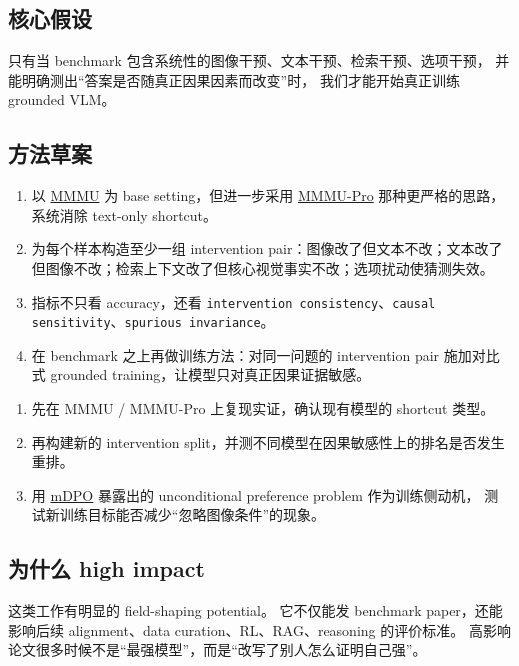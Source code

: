 \documentclass[12pt,a4paper]{article}
\begin{document}
\subsection{核心假设}

只有当 benchmark 包含系统性的图像干预、文本干预、检索干预、选项干预，
并能明确测出``答案是否随真正因果因素而改变''时，
我们才能开始真正训练 grounded VLM。

\subsection{方法草案}

\begin{enumerate}[leftmargin=2em]
  \item 以 \href{https://arxiv.org/abs/2311.16502}{MMMU} 为 base setting，但进一步采用 \href{https://arxiv.org/abs/2409.02813}{MMMU-Pro} 那种更严格的思路，系统消除 text-only shortcut。
  \item 为每个样本构造至少一组 intervention pair：图像改了但文本不改；文本改了但图像不改；检索上下文改了但核心视觉事实不改；选项扰动使猜测失效。
  \item 指标不只看 accuracy，还看 \texttt{intervention consistency}、\texttt{causal sensitivity}、\texttt{spurious invariance}。
  \item 在 benchmark 之上再做训练方法：对同一问题的 intervention pair 施加对比式 grounded training，让模型只对真正因果证据敏感。
\end{enumerate}

\begin{expbox}
\begin{enumerate}[leftmargin=2em]
  \item 先在 MMMU / MMMU-Pro 上复现实证，确认现有模型的 shortcut 类型。
  \item 再构建新的 intervention split，并测不同模型在因果敏感性上的排名是否发生重排。
  \item 用 \href{https://arxiv.org/abs/2406.11839}{mDPO} 暴露出的 unconditional preference problem 作为训练侧动机，
  测试新训练目标能否减少``忽略图像条件''的现象。
\end{enumerate}
\end{expbox}

\subsection{为什么 high impact}

这类工作有明显的 field-shaping potential。
它不仅能发 benchmark paper，还能影响后续 alignment、data curation、RL、RAG、reasoning 的评价标准。
高影响论文很多时候不是``最强模型''，而是``改写了别人怎么证明自己强''。
\end{document}
